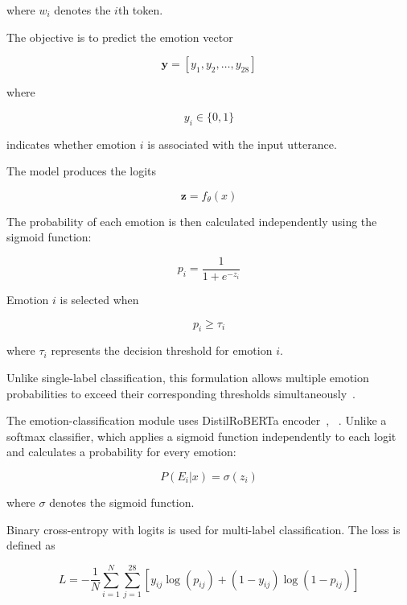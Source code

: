 \documentclass[graybox]{svmult}
\begin{document}
where $w_i$ denotes the $i$th token.

The objective is to predict the emotion vector

\begin{equation}
\mathbf{y}=[y_1,y_2,\ldots,y_{28}]
\end{equation}

where

\begin{equation}
y_i \in \{0,1\}
\end{equation}

indicates whether emotion $i$ is associated with the input utterance.

The model produces the logits

\begin{equation}
\mathbf{z}=f_{\theta}(x)
\end{equation}

The probability of each emotion is then calculated independently using the sigmoid function:

\begin{equation}
p_i = \frac{1}{1+e^{-z_i}}
\end{equation}

Emotion $i$ is selected when

\begin{equation}
p_i \geq \tau_i
\end{equation}

where $\tau_i$ represents the decision threshold for emotion $i$.

Unlike single-label classification, this formulation allows multiple emotion probabilities to exceed their corresponding thresholds simultaneously~\cite{demszky2020goemotions,huang2021seq2emo}.

The emotion-classification module uses DistilRoBERTa encoder~\cite{vaswani2017attention}, ~\cite{liu2019roberta}. Unlike a softmax classifier, which applies a sigmoid function independently to each logit and calculates a probability for every emotion:

\begin{equation}
P(E_i|x) = \sigma(z_i)
\end{equation}

where $\sigma$ denotes the sigmoid function.


Binary cross-entropy with logits is used for multi-label classification. The loss is defined as

\begin{equation}
L =
-\frac{1}{N}
\sum_{i=1}^{N}
\sum_{j=1}^{28}
[
y_{ij}\log(p_{ij})
+
(1-y_{ij})\log(1-p_{ij})
]
\end{equation}
\end{document}
